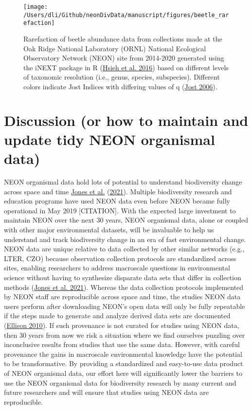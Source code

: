 \documentclass[
  12pt,
]{article}
\begin{document}
\begin{figure}

{\centering \texttt{[image: /Users/dli/Github/neonDivData/manuscript/figures/beetle\_rarefaction]} 

}

\caption{Rarefaction of beetle abundance data from collections made at the Oak Ridge National Laboratory (ORNL) National Ecological Observatory Network (NEON) site from 2014-2020 generated using the iNEXT package in R (\protect\hyperlink{ref-hsieh2016inext}{Hsieh et al. 2016}) based on different levels of taxonomic resolution (i.e., genus, species, subspecies). Different colors indicate Jost Indices with differing values of q (\protect\hyperlink{ref-jost2006entropy}{Jost 2006}).}\label{fig:Fig3Curve}
\end{figure}

\hypertarget{discussion-or-how-to-maintain-and-update-tidy-neon-organismal-data}{%
\section{Discussion (or how to maintain and update tidy NEON organismal data)}\label{discussion-or-how-to-maintain-and-update-tidy-neon-organismal-data}}

NEON organismal data hold lots of potential to understand biodiversity change across space and time \protect\hyperlink{ref-jones2021synergies}{Jones et al.} (\protect\hyperlink{ref-jones2021synergies}{2021}). Multiple biodiversity research and education programs have used NEON data even before NEON became fully operational in May 2019 {[}CITATION{]}. With the expected large investment to maintain NEON over the next 30 years, NEON organismal data, alone or coupled with other major environmental datasets, will be invaluable to help us understand and track biodiversity change in an era of fast environmental change. NEON data are unique relative to data collected by other similar networks (e.g., LTER, CZO) because observation collection protocols are standardized across sites, enabling researchers to address macroscale questions in environmental science without having to synthesize disparate data sets that differ in collection methods (\protect\hyperlink{ref-jones2021synergies}{Jones et al. 2021}). Whereas the data collection protocols implemented by NEON staff are reproducible across space and time, the studies NEON data users perform after downloading NEON's open data will only be fully repeatable if the steps made to generate and analyze derived data sets are documented (\protect\hyperlink{ref-ellison2010repeatability}{Ellison 2010}). If such provenance is not curated for studies using NEON data, then 30 years from now we risk a situation where we find ourselves puzzling over inconclusive results from studies that use the same data. However, with careful provenance the gains in macroscale environmental knowledge have the potential to be transformative. By providing a standardized and easy-to-use data product of NEON organismal data, our effort here will significantly lower the barriers to use the NEON organismal data for biodiversity research by many current and future researchers and will ensure that studies using NEON data are reproducible.
\end{document}
